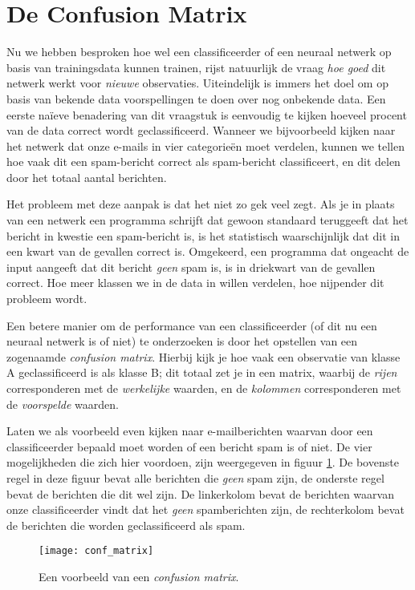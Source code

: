 
\section{De Confusion Matrix}
Nu we hebben besproken hoe wel een classificeerder of een neuraal netwerk op basis van trainingsdata kunnen trainen, rijst natuurlijk de vraag \textit{hoe goed} dit netwerk werkt voor \textit{nieuwe} observaties. Uiteindelijk is immers het doel om op basis van bekende data voorspellingen te doen over nog onbekende data. Een eerste naïeve benadering van dit vraagstuk is eenvoudig te kijken hoeveel procent van de data correct wordt geclassificeerd. Wanneer we bijvoorbeeld kijken naar het netwerk dat onze e-mails in vier categorieën moet verdelen, kunnen we tellen hoe vaak dit een spam-bericht correct als spam-bericht classificeert, en dit delen door het totaal aantal berichten.

Het probleem met deze aanpak is dat het niet zo gek veel zegt. Als je in plaats van een netwerk een programma schrijft dat gewoon standaard teruggeeft dat het bericht in kwestie een spam-bericht is, is het statistisch waarschijnlijk dat dit in een kwart van de gevallen correct is. Omgekeerd, een programma dat ongeacht de input aangeeft dat dit bericht \textit{geen} spam is, is in driekwart van de gevallen correct. Hoe meer klassen we in de data in willen verdelen, hoe nijpender dit probleem wordt.

Een betere manier om de performance van een classificeerder (of dit nu een neuraal netwerk is of niet) te onderzoeken is door het opstellen van een zogenaamde \textit{confusion matrix}. Hierbij kijk je hoe vaak een observatie van klasse A geclassificeerd is als klasse B; dit totaal zet je in een matrix, waarbij de \textit{rijen} corresponderen met de \textit{werkelijke} waarden, en de \textit{kolommen} corresponderen met de \textit{voorspelde} waarden. 

Laten we als voorbeeld even kijken naar e-mailberichten waarvan door een classificeerder bepaald moet worden of een bericht spam is of niet. De vier mogelijkheden die zich hier voordoen, zijn weergegeven in figuur \ref{img:conf_matrix1}. De bovenste regel in deze figuur bevat alle berichten die \textit{geen} spam zijn, de onderste regel bevat de berichten die dit wel zijn. De linkerkolom bevat de berichten waarvan onze classificeerder vindt dat het \textit{geen} spamberichten zijn, de rechterkolom bevat de berichten die worden geclassificeerd als spam.

\begin{figure}[h]
\centering
\texttt{[image: conf\_matrix]}
\caption{Een voorbeeld van een \textit{confusion matrix}.\label{img:conf_matrix1}}
\end{figure}


